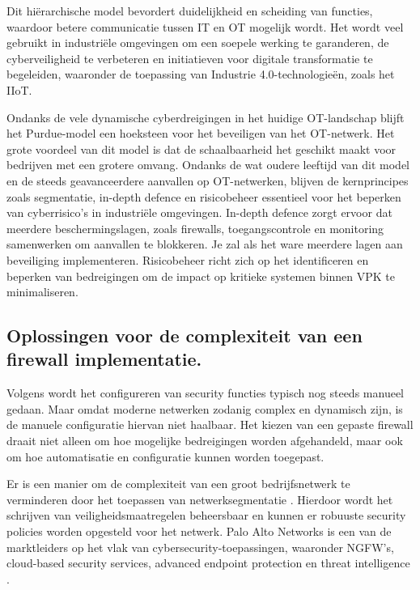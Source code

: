 Dit hiërarchische model bevordert duidelijkheid en scheiding van functies, waardoor betere communicatie tussen IT en OT mogelijk wordt. Het wordt veel gebruikt in industriële omgevingen om een soepele werking te garanderen, de cyberveiligheid te verbeteren en initiatieven voor digitale transformatie te begeleiden, waaronder de toepassing van Industrie 4.0-technologieën, zoals het IIoT. \autocite{Commers2025}

Ondanks de vele dynamische cyberdreigingen in het huidige OT-landschap blijft het Purdue-model een hoeksteen voor het beveiligen van het OT-netwerk. Het grote voordeel van dit model is dat de schaalbaarheid het geschikt maakt voor bedrijven met een grotere omvang. Ondanks de wat oudere leeftijd van dit model en de steeds geavanceerdere aanvallen op OT-netwerken, blijven de kernprincipes zoals segmentatie, in-depth defence en risicobeheer essentieel voor het beperken van cyberrisico’s in industriële omgevingen. In-depth defence zorgt ervoor dat meerdere beschermingslagen, zoals firewalls, toegangscontrole en monitoring samenwerken om aanvallen te blokkeren. Je zal als het ware meerdere lagen aan beveiliging implementeren. Risicobeheer richt zich op het identificeren en beperken van bedreigingen om de impact op kritieke systemen binnen VPK te minimaliseren.

\subsection{Oplossingen voor de complexiteit van een firewall implementatie.}

Volgens \textcite{Bringhenti2023} wordt het configureren van security functies typisch nog steeds manueel gedaan. Maar omdat moderne netwerken zodanig complex en dynamisch zijn, is de manuele configuratie hiervan niet haalbaar. Het kiezen van een gepaste firewall draait niet alleen om hoe mogelijke bedreigingen worden afgehandeld, maar ook om hoe automatisatie en configuratie kunnen worden toegepast.

Er is een manier om de complexiteit van een groot bedrijfsnetwerk te verminderen door het toepassen van netwerksegmentatie \autocite{Bringhenti2023}. Hierdoor wordt het schrijven van veiligheidsmaatregelen beheersbaar en kunnen er robuuste security policies worden opgesteld voor het netwerk. Palo Alto Networks is een van de marktleiders op het vlak van cybersecurity-toepassingen, waaronder NGFW’s, cloud-based security services, advanced endpoint protection en threat intelligence \autocite{TechnicalWhitepaper2014}.

